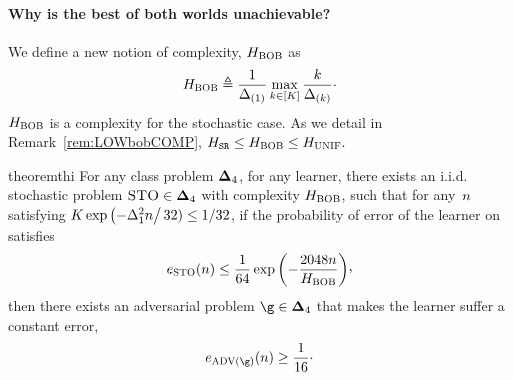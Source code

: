 %
\paragraph{Why is the best of both worlds unachievable?}
% 
We define a new notion of complexity, $H_{{\normalfont \textsc{{BOB}}}}$ as
%
\[
%
\complexityBoth 
\triangleq
\frac{1}{
\gap_{(1)}}
\max_{k\in\setArms}\frac{k}{\gap_{(k)}}\cdot
%
\]
%
$H_{{\normalfont \textsc{{BOB}}}} $ is a complexity for
the stochastic case.
As we detail  in Remark~\ref{rem:LOWbobCOMP}, 
$	H_{{\normalfont \texttt{SR}}}\leq H_{{\normalfont \textsc{{BOB}}}}\leq H_{{\normalfont \textsc{UNIF}}}.$
%
\begin{restatable}[\textcolor{titleTh}{Lower bound for the BOB challenge}]{theorem}{thi}\label{th:lowBOB}
     For any class problem $\boldsymbol{\Delta}_{4}$, for any learner, 
     there exists an i.i.d.\,stochastic problem $\textsc{STO}\in\boldsymbol{\Delta}_{4}$ with complexity $H_{{\normalfont \textsc{{BOB}}}}$,
     such that  for any~$n$ satisfying  	$K\exp\left(-\Delta^2_1n\right/32)\leq 1/32$,  if
	the probability of error of the learner
	 on  \stoPro{}   
	satisfies
%	
	\[	
\ProErr_{\stoPro}(\timeHorizon)
	\leq
	\frac{1}{64}\exp\left(-\frac{2048\timeHorizon}{\complexityBoth}\right)\!\CommaBin
	\]	
%
	then there exists an adversarial problem $\gainVector\in\Gaps_{4}$
	   that  makes the learner suffer a 
	constant error,
	\[	
	\ProErr_{\advPro(\gainVector)}(\timeHorizon)
	\geq
	 \frac{1}{16}\cdot
	\]
      \end{restatable}    
%
